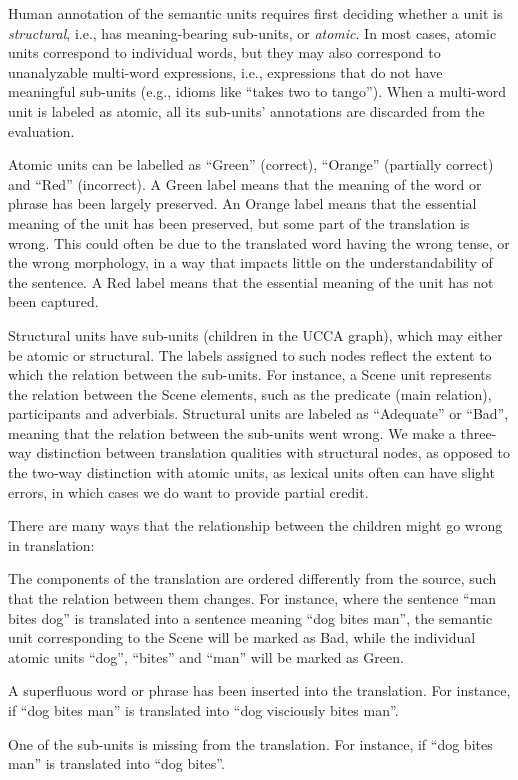 \documentclass[11pt]{article}
\begin{document}
Human annotation of the semantic units requires first deciding whether
a unit is {\it structural}, i.e., has meaning-bearing sub-units,
or {\it atomic}. In most cases, atomic units
correspond to individual words, but they may also correspond to unanalyzable
multi-word expressions, i.e., expressions that do not have meaningful sub-units
(e.g., idioms like ``takes two to tango'').
When a multi-word unit is labeled as atomic, all its sub-units' annotations are discarded
from the evaluation.

Atomic units can be labelled as ``Green'' (correct), ``Orange'' (partially correct)
and ``Red'' (incorrect). 
A Green label means that the meaning of the word or phrase has been largely preserved.
An Orange label means that the essential meaning of the unit has been preserved,
but some part of the translation is wrong.
This could often be due to the translated word having the wrong tense,
or the wrong morphology, in a way that impacts little on the understandability of the sentence.
A Red label means that the essential meaning of the unit has not been captured.

Structural units have sub-units (children in the UCCA graph), which may either be
atomic or structural. The labels assigned to such nodes reflect the extent to which
the relation between the sub-units.
For instance, a Scene unit represents the relation between the
Scene elements, such as the predicate (main relation), participants and adverbials.
Structural units are labeled as ``Adequate'' or ``Bad'', meaning
that the relation between the sub-units went wrong.
We make a three-way distinction between translation qualities with structural
nodes, as opposed to the two-way distinction with atomic units, as lexical units
often can have slight errors, in which cases we do want to provide partial credit.

There are many ways that the relationship between the children might go
wrong in translation:

\begin{compactitem}
\item The components of the translation are ordered differently from the source,
  such that the relation between them changes. For instance, where
  the sentence ``man bites dog'' is translated into a sentence meaning ``dog bites man'',
  the semantic unit corresponding to the Scene will be marked as Bad, while
  the individual atomic units ``dog'', ``bites'' and ``man'' will be marked as Green.
\item A superfluous word or phrase has been inserted into
  the translation. For instance, if ``dog bites man'' is translated into ``dog visciously bites man''.
\item One of the sub-units is missing from the translation.
  For instance, if ``dog bites man'' is translated into ``dog bites''.
\end{compactitem}
\end{document}
